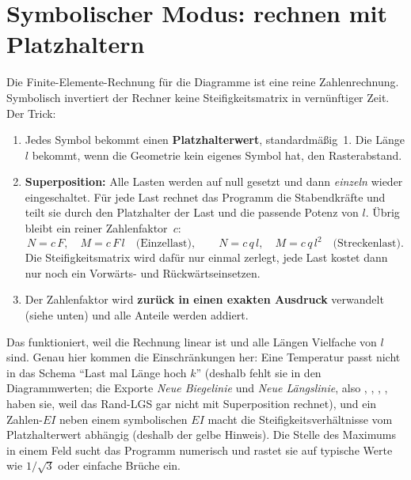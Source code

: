 \section{Symbolischer Modus: rechnen mit Platzhaltern}\label{sec:mathe-symbolisch}

Die Finite-Elemente-Rechnung für die Diagramme ist eine reine Zahlenrechnung. Symbolisch
invertiert der Rechner keine Steifigkeitsmatrix in vernünftiger Zeit. Der Trick:

\begin{enumerate}
  \item Jedes Symbol bekommt einen \textbf{Platzhalterwert}, standardmäßig~1. Die Länge $l$
        bekommt, wenn die Geometrie kein eigenes Symbol hat, den Rasterabstand.
  \item \textbf{Superposition:} Alle Lasten werden auf null gesetzt und dann \emph{einzeln} wieder
        eingeschaltet. Für jede Last rechnet das Programm die Stabendkräfte und teilt sie durch den
        Platzhalter der Last und die passende Potenz von $l$. Übrig bleibt ein reiner
        Zahlenfaktor~$c$:
        \[
          N = c\,F, \quad M = c\,F\,l \quad\text{(Einzellast)}, \qquad
          N = c\,q\,l, \quad M = c\,q\,l^2 \quad\text{(Streckenlast)} .
        \]
        Die Steifigkeitsmatrix wird dafür nur einmal zerlegt, jede Last kostet dann nur noch ein
        Vorwärts- und Rückwärtseinsetzen.
  \item Der Zahlenfaktor wird \textbf{zurück in einen exakten Ausdruck} verwandelt (siehe unten)
        und alle Anteile werden addiert.
\end{enumerate}

Das funktioniert, weil die Rechnung linear ist und alle Längen Vielfache von $l$ sind. Genau hier
kommen die Einschränkungen her: Eine Temperatur passt nicht in das Schema \enquote{Last mal
Länge hoch $k$} (deshalb fehlt sie in den Diagrammwerten; die Exporte \emph{Neue Biegelinie} und
\emph{Neue Längslinie}, also , , , , haben sie, weil das
Rand-LGS gar nicht mit Superposition rechnet), und ein Zahlen-$EI$
neben einem symbolischen $EI$ macht die Steifigkeitsverhältnisse vom Platzhalterwert abhängig
(deshalb der gelbe Hinweis). Die Stelle des Maximums in einem Feld sucht das Programm numerisch
und rastet sie auf typische Werte wie $1/\sqrt 3$ oder einfache Brüche ein.

